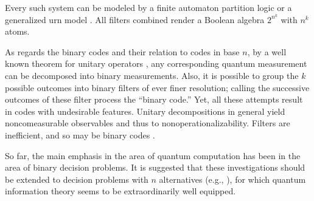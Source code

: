 Every such system can be modeled
by a finite automaton
partition logic \cite{svozil-93,schaller-96,dvur-pul-svo,cal-sv-yu,svozil-ql}
or a generalized urn model   \cite{wright:pent,wright,svozil-2001-eua}.
All filters combined render a Boolean algebra $2^{n^k}$ with ${n^k}$ atoms.

As regards the binary codes and their relation to codes in base $n$,
by a well known theorem for unitary operators
\cite{murnaghan},
any corresponding quantum measurement can be decomposed
into binary measurements.
Also, it is possible to group the $k$ possible outcomes into binary filters of
ever finer resolution; calling the successive outcomes of these filter process
the ``binary code.''
Yet, all these attempts result in codes with undesirable features.
Unitary decompositions in general yield noncomeasurable observables and thus to
nonoperationalizability. Filters are inefficient, and so may be binary codes
\cite{Cal-Cam-96}.

So far, the main emphasis in the area of quantum computation
has been in the area of binary decision problems.
It is suggested that these investigations should be extended to
decision problems with $n$ alternatives (e.g., \cite[pp. 332-340]{kleene-52}),
for which quantum information theory seems
to be extraordinarily well equipped.


